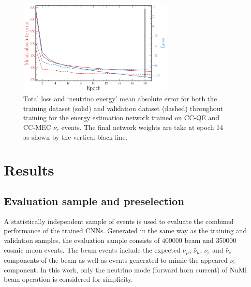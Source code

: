 \begin{figure} %
    \includegraphics[width=0.7\textwidth]{diagrams/6-cvn/chipsnet/final_energy_history.pdf}
    \caption[Loss and mean absolute error throughout training for the beam classification network.]
    {Total loss and `neutrino energy' mean absolute error for both the training dataset (solid)
        and validation dataset (dashed) throughout training for the energy estimation network
        trained on CC-QE and CC-MEC $\nu_{e}$ events. The final network weights are take at epoch
        14 as shown by the vertical black line.}
    \label{fig:final_energy_history}
\end{figure}

\section{Results} %
\label{sec:cvn_results} %

\subsection{Evaluation sample and preselection} %
\label{sec:cvn_results_sample} %

A statistically independent sample of events is used to evaluate the combined performance of the
trained CNNs. Generated in the same way as the training and validation samples, the evaluation
sample consists of 400000 beam and 350000 cosmic muon events. The beam events include the expected
$\nu_{\mu}$, $\bar{\nu}_{\mu}$, $\nu_{e}$ and $\bar{\nu}_{e}$ components of the beam as well as
events generated to mimic the appeared $\nu_{e}$ component. In this work, only the neutrino mode
(forward horn current) of NuMI beam operation is considered for simplicity.


